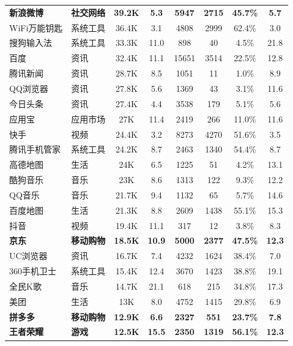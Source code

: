 \begin{ThreePartTable}
\begin{longtable}{l l c c c c c c}
{\bf 新浪微博}\tnote{*} & {\bf 社交网络} & {\bf 39.2K} & {\bf 5.3} & {\bf 5947} & {\bf 2715} & {\bf 45.7\%} & {\bf 5.7} \\
\rowcolor{gray!15} WiFi万能钥匙 & 系统工具 & 36.4K & 3.1 & 4808 & 2999 & 62.4\% & 3.0 \\
搜狗输入法 & 系统工具 & 33.3K & 11.0 & 898 & 40 & 4.5\% & 21.8 \\
\rowcolor{gray!15} 百度 & 资讯 & 32.4K & 11.1 & 15651 & 3514 & 22.5\% & 12.8 \\
腾讯新闻 & 资讯 & 28.7K & 8.5 & 1051 & 11 & 1.0\% & 8.9 \\
\rowcolor{gray!15} QQ浏览器 & 资讯 & 27.8K & 5.6 & 1369 & 43 & 3.1\% & 11.6 \\
今日头条 & 资讯 & 27.4K & 4.4 & 3538 & 179 & 5.1\% & 5.6 \\
\rowcolor{gray!15} 应用宝 & 应用市场 & 27K & 11.4 & 2419 & 266 & 11.0\% & 11.6 \\
快手 & 视频 & 24.4K & 3.2 & 8273 & 4270 & 51.6\% & 3.5 \\
\rowcolor{gray!15} 腾讯手机管家 & 系统工具 & 24.2K & 8.7 & 2463 & 1340 & 54.4\% & 8.7 \\
高德地图 & 生活 & 24K & 6.5 & 1225 & 51 & 4.2\% & 13.1 \\
\rowcolor{gray!15} 酷狗音乐 & 音乐 & 23K & 8.6 & 1313 & 122 & 9.3\% & 12.2 \\
QQ音乐 & 音乐 & 21.7K & 9.4 & 1132 & 65 & 5.7\% & 14.6 \\
\rowcolor{gray!15} 百度地图 & 生活 & 21.3K & 8.8 & 2609 & 1438 & 55.1\% & 15.3 \\
抖音 & 视频 & 19.4K & 11.1 & 317 & 12 & 3.8\% & 8.3 \\
\rowcolor{gray!15} {\bf 京东}\tnote{*} & {\bf 移动购物} & {\bf 18.5K} & {\bf 10.9} & {\bf 5000} & {\bf 2377} & {\bf 47.5\%} & {\bf 12.3} \\
UC浏览器 & 资讯 & 16.7K & 7.4 & 4232 & 1624 & 38.4\% & 7.0 \\
\rowcolor{gray!15} 360手机卫士 & 系统工具 & 15.4K & 12.4 & 3670 & 1423 & 38.8\% & 19.1 \\
全民K歌 & 音乐 & 14.7K & 21.1 & 618 & 215 & 34.8\% & 17.3 \\
\rowcolor{gray!15} 美团 & 生活 & 13K & 8.0 & 4752 & 1415 & 29.8\% & 6.9 \\
{\bf 拼多多}\tnote{*} & {\bf 移动购物} & {\bf 12.9K} & {\bf 6.6} & {\bf 2327} & {\bf 551} & {\bf 23.7\%} & {\bf 7.8} \\
\rowcolor{gray!15} {\bf 王者荣耀}\tnote{*} & {\bf 游戏} & {\bf 12.5K} & {\bf 15.5} & {\bf 2350} & {\bf 1319} & {\bf 56.1\%} & {\bf 12.3} \\

\end{longtable}
\end{ThreePartTable}
